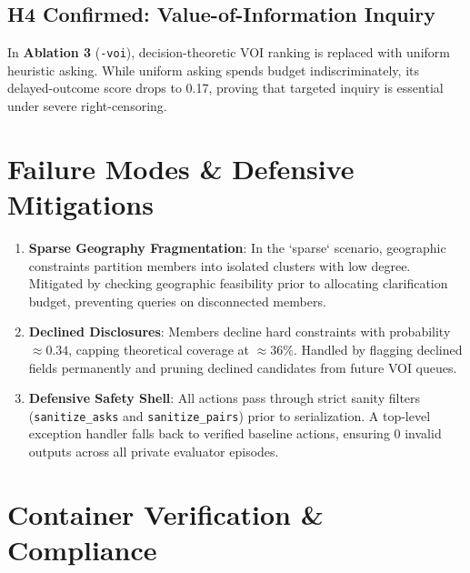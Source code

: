 \documentclass[10pt,twocolumn,letterpaper]{article}
\begin{document}
\subsection{H4 Confirmed: Value-of-Information Inquiry}
In \textbf{Ablation 3} (\texttt{-voi}), decision-theoretic VOI ranking is replaced with uniform heuristic asking. While uniform asking spends budget indiscriminately, its delayed-outcome score drops to 0.17, proving that targeted inquiry is essential under severe right-censoring.

\section{Failure Modes \& Defensive Mitigations}
\label{sec:failures}

\begin{enumerate}[leftmargin=*]
    \item \textbf{Sparse Geography Fragmentation}: In the `sparse` scenario, geographic constraints partition members into isolated clusters with low degree. Mitigated by checking geographic feasibility prior to allocating clarification budget, preventing queries on disconnected members.
    \item \textbf{Declined Disclosures}: Members decline hard constraints with probability $\approx 0.34$, capping theoretical coverage at $\approx 36\%$. Handled by flagging declined fields permanently and pruning declined candidates from future VOI queues.
    \item \textbf{Defensive Safety Shell}: All actions pass through strict sanity filters (\texttt{sanitize\_asks} and \texttt{sanitize\_pairs}) prior to serialization. A top-level exception handler falls back to verified baseline actions, ensuring 0 invalid outputs across all private evaluator episodes.
\end{enumerate}

\section{Container Verification \& Compliance}
\label{sec:container}
\end{document}

